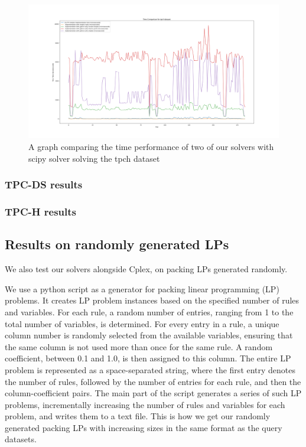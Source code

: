 \begin{figure}[p]
    \begin{adjustbox}{width=\paperwidth,center}
        \includegraphics[width=\paperwidth]{figures/all_scify_mpfi_pfi.png}
    \end{adjustbox}
    \caption{A graph comparing the time performance of two of
        our solvers with scipy solver solving the tpch dataset}
    \label{fig:all_time_tpch}
\end{figure}



\subsubsection{TPC-DS results}
\subsubsection{TPC-H results}


\subsection{Results on randomly generated LPs}
We also test our solvers alongside Cplex, on packing LPs generated randomly.

We use a python script as a generator for packing linear programming (LP) problems.
It creates LP problem instances
based on the specified number of rules and variables.
For each rule, a random number of entries, ranging from 1 to
the total number of variables, is determined.
For every entry in a rule, a unique column number is randomly selected from
the available variables, ensuring that the same column is not used more than once for
the same rule. A random coefficient, between 0.1 and 1.0, is then assigned to
this column. The entire LP problem is represented as a space-separated string,
where the first entry denotes the number of rules, followed by the number of
entries for each rule, and then the column-coefficient pairs.
The main part of
the script generates a series of such LP problems, incrementally increasing the
number of rules and variables for each problem, and writes them to a text file.
This is how we get our randomly generated packing LPs with increasing sizes in the same format
as the query datasets.

